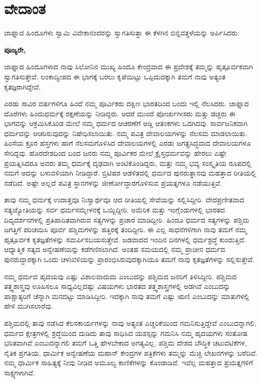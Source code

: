 
\chapter{ವೇದಾಂತ}

ಜಾಫ್ನಾದ ಹಿಂದೂಗಳು ಸ್ವಾಮಿ ವಿವೇಕಾನಂದರನ್ನು ಸ್ವಾಗತಿಸುತ್ತಾ ಈ ಕೆಳಗಿನ ಬಿನ್ನವತ್ತಳೆಯನ್ನು ಅರ್ಪಿಸಿದರು:

\textbf{ಪೂಜ್ಯರೇ,}

ಜಾಫ್ನಾದ ಹಿಂದೂಗಳಾದ ನಾವು ಸಿಲೋನಿನ ಮುಖ್ಯ ಹಿಂದೂ ಕೇಂದ್ರವಾದ ಈ ಪ್ರದೇಶಕ್ಕೆ ತಮ್ಮನ್ನು ಹೃತ್ಪೂರ್ವಕವಾಗಿ ಸ್ವಾಗತಿಸುತ್ತೇವೆ. ಲಂಕಾದ್ವೀಪದ ಈ ಭಾಗಕ್ಕೆ ಬರಲು ಕೃಪೆಯಿಟ್ಟು ಒಪ್ಪಿದುದಕ್ಕಾಗಿ ತಮಗೆ ನಾವು ಅತ್ಯಂತ ಕೃತಜ್ಞರಾಗಿದ್ದೇವೆ.

ಎರಡು ಸಾವಿರ ವರ್ಷಗಳಿಗೂ ಹಿಂದೆ ನಮ್ಮ ಪೂರ್ವಿಕರು ದಕ್ಷಿಣ ಭಾರತದಿಂದ ಬಂದು ಇಲ್ಲಿ ನೆಲಸಿದರು. ಜಾಫ್ನಾದ ದೊರೆಗಳು ಹಿಂದುಧರ್ಮಕ್ಕೆ ರಕ್ಷಣೆಯನ್ನು ನೀಡಿದ್ದರು. ಆದರೆ ಮುಂದೆ ಪೋರ್ಚುಗೀಸರು ಮತ್ತು ಡಚ್ಚರು ಈ ಭಾಗವನ್ನು ಆಕ್ರಮಿಸಿಕೊಂಡ ಮೇಲೆ ನಮ್ಮ ಧರ್ಮದ ಆಚರಣೆಗೆ ಅಡ್ಡಿ ಆತಂಕಗಳು ಒದಗಿದವು. ಸಾರ್ವಜನಿಕವಾಗಿ ಧರ್ಮವನ್ನು ಆಚರಿಸುವುದನ್ನು ನಿಷೇಧಿಸಲಾಯಿತು. ನಮ್ಮ ಪವಿತ್ರ ದೇವಾಲಯಗಳನ್ನು ನೆಲಸಮ ಮಾಡಲಾಯಿತು. ಹಿಂಸೆಯ ಕ್ರೂರ ಹಸ್ತಗಳು ಹಾಗೆ ನೆಲಸಮಗೊಳಿಸಿದ ದೇವಾಲಯಗಳಲ್ಲಿ ಎರಡು ಜಗತ್ಪ್ರಸಿದ್ಧವಾದ ದೇವಾಲಯಗಳೂ ಸೇರಿದ್ದವು. ಹೊರದೇಶದಿಂದ ಬಂದ ಜನರು ನಮ್ಮ ಪೂರ್ವಿಕರ ಮೇಲೆ ಕ್ರೈಸ್ತಧರ್ಮವನ್ನು ಹೇರಲು ಎಷ್ಟೇ ಪ್ರಯತ್ನಿಸಿದರೂ ಅವರು ತಮ್ಮ ಧರ್ಮಕ್ಕೆ ದೃಢವಾಗಿ ಅಂಟಿಕೊಂಡಿದ್ದರು, ಮತ್ತು ನಮ್ಮ ಭವ್ಯ ಸಂಸ್ಕೃತಿಯ ರೂಪದಲ್ಲಿ ನಮಗೆ ಅದನ್ನು ಬಳುವಳಿಯಾಗಿ ನೀಡಿದ್ದಾರೆ. ಬ್ರಿಟಿಷರ ಆಡಳಿತದಲ್ಲಿ ಧರ್ಮದ ಪುನರುತ್ಥಾನವು ಮಹತ್ತಾದ ರೀತಿಯಲ್ಲಿ ನಡೆದಿದೆ. ಅಷ್ಟೇ ಅಲ್ಲದೆ ಪವಿತ್ರ ಸ್ಥಾನಗಳನ್ನು ಜೀರ್ಣೋದ್ಧಾರಗೊಳಿಸುವ ಪ್ರಯತ್ನಗಳೂ ನಡೆಯುತ್ತಿವೆ.

ತಾವು ನಮ್ಮ ಧರ್ಮಕ್ಕೆ ಉದಾತ್ತವೂ ನಿಃಸ್ವಾರ್ಥವೂ ಆದ ರೀತಿಯಲ್ಲಿ ಸೇವೆಯನ್ನು ಸಲ್ಲಿಸಿದ್ದೀರಿ. ವೇದಪ್ರಣೀತವಾದ ಸತ್ಯಜ್ಯೋತಿಯನ್ನು ಸರ್ವ ಧರ್ಮಸಮ್ಮೇಳನಕ್ಕೆ ಒಯ್ದಿದ್ದೀರಿ. ಅಮೆರಿಕ ಮತ್ತು ಇಂಗ್ಲೆಂಡುಗಳಲ್ಲಿ ಭಾರತದ ದಿವ್ಯದರ್ಶನಗಳಲ್ಲಿ ಪ್ರತಿಪಾದಿತವಾಗಿರುವ ಸತ್ಯಗಳನ್ನು ಪ್ರಚಾರ ಮಾಡಿದ್ದೀರಿ. ಹಿಂದೂ ಧರ್ಮದ ಸತ್ಯಗಳನ್ನು ಪಶ್ಚಿಮ ಜಗತ್ತಿಗೆ ಪರಿಚಯಿಸಿ ಪೂರ್ವ ಪಶ್ಚಿಮಗಳನ್ನು ಹತ್ತಿರಕ್ಕೆ ತಂದಿದ್ದೀರಿ. ಈ ಎಲ್ಲ ಸಾಧನೆಗಳಿಗಾಗಿ ನಾವು ತಮಗೆ ನಮ್ಮ ಹೃತ್ಪೂರ್ವಕ ಕೃತಜ್ಞತೆಗಳನ್ನು ಸಮರ್ಪಿಸಬಯಸುತ್ತೇವೆ. ಜಡವಾದದ ಇಂದಿನ ದಿನಗಳಲ್ಲಿ ಧರ್ಮಶ್ರದ್ಧೆ ಕುಂದುತ್ತಿದೆ. ಆಧ್ಯಾತ್ಮಿಕ ಸತ್ಯದ ಅನ್ವೇಷಣೆಯನ್ನು ಕಡೆಗಣಿಸಲಾಗಿದೆ. ಅಂತಹ ಸಮಯದಲ್ಲಿ ನಮ್ಮ ಪ್ರಾಚೀನ ಧರ್ಮದ ಪುನರುದ್ಧಾರಕ್ಕಾಗಿ ಒಂದು ಚಳುವಳಿಯನ್ನು ಪ್ರಾರಂಭಿಸಿರುವುದಕ್ಕಾಗಿಯೂ ತಮಗೆ ನಾವು ಕೃತಜ್ಞತೆಗಳನ್ನು ಸಲ್ಲಿಸುತ್ತೇವೆ.

ನಮ್ಮ ಧರ್ಮದ ಹೃದಯವು ಎಷ್ಟು ವಿಶಾಲವಾದುದು ಎಂಬುದನ್ನು ಪಶ್ಚಿಮದ ಜನರಿಗೆ ತಿಳಿಸಿದ್ದೀರಿ. ಪಶ್ಚಿಮದ ತತ್ತ್ವಶಾಸ್ತ್ರವು ಊಹಿಸಲೂ ಸಾಧ್ಯವಿಲ್ಲದಷ್ಟು ವಿಷಯಗಳು ಭಾರತದ ತತ್ತ್ವಶಾಸ್ತ್ರಗಳಲ್ಲಿ ಅಡಗಿವೆ ಎಂಬುದನ್ನು ಪಾಶ್ಚಾತ್ಯರಿಗೆ ಚೆನ್ನಾಗಿ ಮನದಟ್ಟು ಮಾಡಿಸಿದ್ದೀರಿ. ಇದಕ್ಕಾಗಿ ನಾವು ತಮಗೆ ಎಷ್ಟು ಋಣಿ ಎಂಬುದನ್ನು ಮಾತುಗಳಲ್ಲಿ ಹೇಳಿ ಮುಗಿಸಲಾರೆವು.

ಪಶ್ಚಿಮದಲ್ಲಿ ತಾವು ನಡೆಸಿದ ಕೆಲಸಕಾರ್ಯಗಳನ್ನು ನಾವು ಅತ್ಯಂತ ಎಚ್ಚರಿಕೆಯಿಂದ ಗಮನಿಸುತ್ತಿದ್ದೇವೆ ಎಂಬುದನ್ನಾಗಲಿ, ಧರ್ಮದ ಕ್ಷೇತ್ರಗಳಲ್ಲಿ ಶ್ರದ್ಧೆಯಿಂದ ದುಡಿದು ತಾವು ಸಾಧಿಸಿದ ಯಶಸ್ಸನ್ನು ಗಮನಿಸಿ ನಮ್ಮ ಹೃದಯಗಳು ಸಂತೋಷ ಭರಿತವಾಗಿವೆ ಎಂಬುದನ್ನಾಗಲಿ ತಮಗೆ ಒತ್ತಿ ಹೇಳಬೇಕಾದ ಅಗತ್ಯವಿಲ್ಲ. ಪಶ್ಚಿಮ ದೇಶದ ಬೌದ್ಧಿಕ ಚಟುವಟಿಕೆಗಳ, ನೈತಿಕ ಪ್ರಗತಿಯ, ಧಾರ್ಮಿಕ ಅನ್ವೇಷಣೆಯ ಮಹಾನ್​ ಕೇಂದ್ರಗಳ ಪತ್ರಿಕೆಗಳು ತಮ್ಮನ್ನು ಮೆಚ್ಚಿ ಲೇಖನಗಳನ್ನು ಬರೆದಿವೆ. ನಮ್ಮ ಧಾರ್ಮಿಕ ಸಾಹಿತ್ಯಕ್ಕೆ ನೀವು ನೀಡಿದ ಅಮೂಲ್ಯ ಕಾಣಿಕೆಗಳನ್ನು ಕೊಂಡಾಡಿವೆ. ಇವೆಲ್ಲ ಮಹತ್ತಾದ ಪ್ರಯತ್ನಗಳಿಗೆ ಸಾಕ್ಷ್ಯಗಳಾಗಿವೆ.

